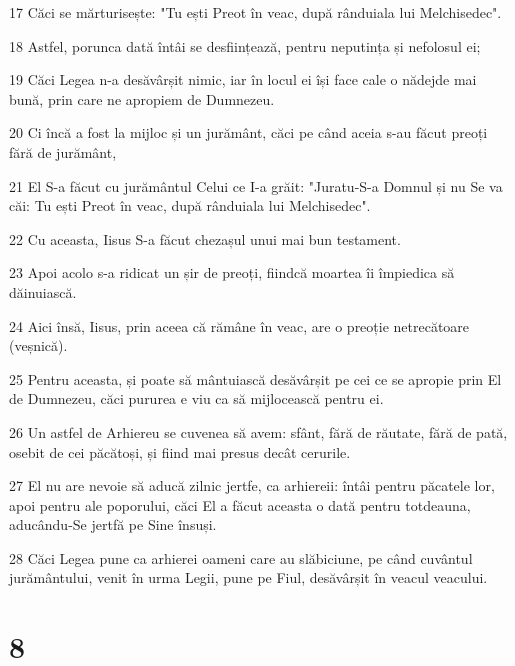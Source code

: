 \par 17 Căci se mărturisește: "Tu ești Preot în veac, după rânduiala lui Melchisedec".
\par 18 Astfel, porunca dată întâi se desființează, pentru neputința și nefolosul ei;
\par 19 Căci Legea n-a desăvârșit nimic, iar în locul ei își face cale o nădejde mai bună, prin care ne apropiem de Dumnezeu.
\par 20 Ci încă a fost la mijloc și un jurământ, căci pe când aceia s-au făcut preoți fără de jurământ,
\par 21 El S-a făcut cu jurământul Celui ce I-a grăit: "Juratu-S-a Domnul și nu Se va căi: Tu ești Preot în veac, după rânduiala lui Melchisedec".
\par 22 Cu aceasta, Iisus S-a făcut chezașul unui mai bun testament.
\par 23 Apoi acolo s-a ridicat un șir de preoți, fiindcă moartea îi împiedica să dăinuiască.
\par 24 Aici însă, Iisus, prin aceea că rămâne în veac, are o preoție netrecătoare (veșnică).
\par 25 Pentru aceasta, și poate să mântuiască desăvârșit pe cei ce se apropie prin El de Dumnezeu, căci pururea e viu ca să mijlocească pentru ei.
\par 26 Un astfel de Arhiereu se cuvenea să avem: sfânt, fără de răutate, fără de pată, osebit de cei păcătoși, și fiind mai presus decât cerurile.
\par 27 El nu are nevoie să aducă zilnic jertfe, ca arhiereii: întâi pentru păcatele lor, apoi pentru ale poporului, căci El a făcut aceasta o dată pentru totdeauna, aducându-Se jertfă pe Sine însuși.
\par 28 Căci Legea pune ca arhierei oameni care au slăbiciune, pe când cuvântul jurământului, venit în urma Legii, pune pe Fiul, desăvârșit în veacul veacului.

\chapter{8}

